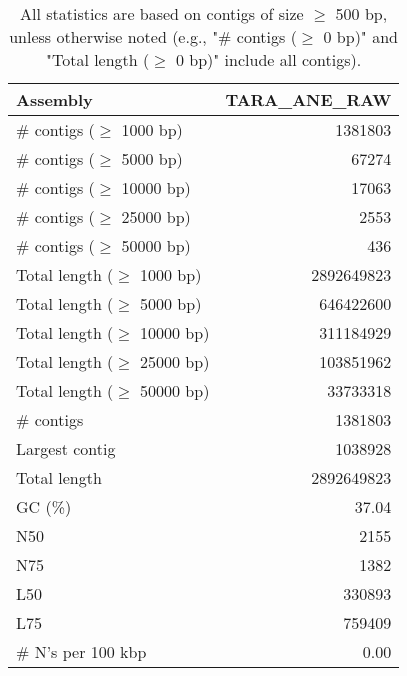 \documentclass[12pt,a4paper]{article}
\begin{document}
\begin{table}[ht]
\begin{center}
\caption{All statistics are based on contigs of size $\geq$ 500 bp, unless otherwise noted (e.g., "\# contigs ($\geq$ 0 bp)" and "Total length ($\geq$ 0 bp)" include all contigs).}
\begin{tabular}{|l*{1}{|r}|}
\hline
Assembly & TARA\_ANE\_RAW \\ \hline
\# contigs ($\geq$ 1000 bp) & 1381803 \\ \hline
\# contigs ($\geq$ 5000 bp) & 67274 \\ \hline
\# contigs ($\geq$ 10000 bp) & 17063 \\ \hline
\# contigs ($\geq$ 25000 bp) & 2553 \\ \hline
\# contigs ($\geq$ 50000 bp) & 436 \\ \hline
Total length ($\geq$ 1000 bp) & 2892649823 \\ \hline
Total length ($\geq$ 5000 bp) & 646422600 \\ \hline
Total length ($\geq$ 10000 bp) & 311184929 \\ \hline
Total length ($\geq$ 25000 bp) & 103851962 \\ \hline
Total length ($\geq$ 50000 bp) & 33733318 \\ \hline
\# contigs & 1381803 \\ \hline
Largest contig & 1038928 \\ \hline
Total length & 2892649823 \\ \hline
GC (\%) & 37.04 \\ \hline
N50 & 2155 \\ \hline
N75 & 1382 \\ \hline
L50 & 330893 \\ \hline
L75 & 759409 \\ \hline
\# N's per 100 kbp & 0.00 \\ \hline
\end{tabular}
\end{center}
\end{table}
\end{document}

